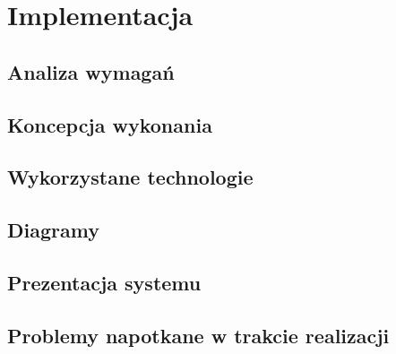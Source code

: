 \chapter{Implementacja}
\label{cha:rozdz4}

\section{Analiza wymagań}

\section{Koncepcja wykonania}

\section{Wykorzystane technologie}

\section{Diagramy}

\section{Prezentacja systemu}

\section{Problemy napotkane w trakcie realizacji}